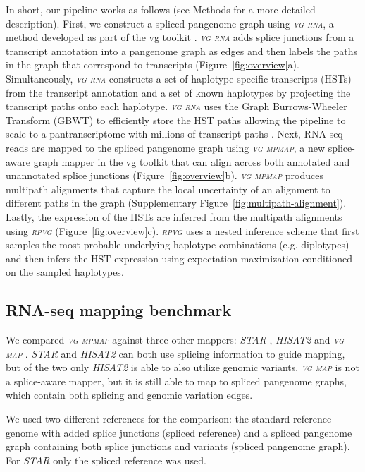 \documentclass[11pt]{ucthesis}
\newcommand{\tool}[1]{\emph{\textsc{#1}}}
\begin{document}
In short, our pipeline works as follows (see Methods for a more detailed description). First, we construct a spliced pangenome graph using \tool{vg rna}, a method developed as part of the vg toolkit \cite{garrison2018variation}. \tool{vg rna} adds splice junctions from a transcript annotation into a pangenome graph as edges and then labels the paths in the graph that correspond to transcripts (Figure~\ref{fig:overview}a). Simultaneously, \tool{vg rna} constructs a set of haplotype-specific transcripts (HSTs) from the transcript annotation and a set of known haplotypes by projecting the transcript paths onto each haplotype. \tool{vg rna} uses the Graph Burrows-Wheeler Transform (GBWT) to efficiently store the HST paths allowing the pipeline to scale to a pantranscriptome with millions of transcript paths \cite{siren2020haplotype}. Next, RNA-seq reads are mapped to the spliced pangenome graph using \tool{vg mpmap}, a new splice-aware graph mapper in the vg toolkit that can align across both annotated and unannotated splice junctions (Figure~\ref{fig:overview}b). \tool{vg mpmap} produces multipath alignments that capture the local uncertainty of an alignment to different paths in the graph (Supplementary Figure~\ref{fig:multipath-alignment}). Lastly, the expression of the HSTs are inferred from the multipath alignments using \tool{rpvg} (Figure~\ref{fig:overview}c). \tool{rpvg} uses a nested inference scheme that first samples the most probable underlying haplotype combinations (e.g. diplotypes) and then infers the HST expression using expectation maximization conditioned on the sampled haplotypes.

\subsection{RNA-seq mapping benchmark}

We compared \tool{vg mpmap} against three other mappers: \tool{STAR} \cite{dobin2013star}, \tool{HISAT2} \cite{kim2019graph} and \tool{vg map} \cite{garrison2018variation}. \tool{STAR} and \tool{HISAT2} can both use splicing information to guide mapping, but of the two only \tool{HISAT2} is able to also utilize genomic variants. \tool{vg map} is not a splice-aware mapper, but it is still able to map to spliced pangenome graphs, which contain both splicing and genomic variation edges. 

We used two different references for the comparison: the standard reference genome with added splice junctions (spliced reference) and a spliced pangenome graph containing both splice junctions and variants (spliced pangenome graph). For \tool{STAR} only the spliced reference was used. 
\end{document}
